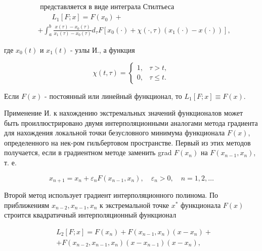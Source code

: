 \documentclass[10pt]{article}
\begin{document}
\[

\begin{aligned}

& \text { представляется в виде интеграла Стилтьеса } \\

& \qquad L_{1}[F ; x]=F\left(x_{0}\right)+ \\

& +\int_{a}^{b} \frac{x(\tau)-x_{0}(\tau)}{x_{1}(\tau)-x_{0}(\tau)} d_{\tau} F\left[x_{0}(\cdot)+\chi(\cdot, \tau)\left(x_{1}(\cdot)-x(\cdot)\right)\right],

\end{aligned}

\]



где $x_{0}(t)$ и $x_{1}(t)$ - узлы И., а функция



\[

\chi(t, \tau)= \begin{cases}1, & \tau>t, \\ 0, & \tau \leqslant t .\end{cases}

\]



Если $F(x)$ - постоянный или линейный функционал, то $L_{1}[F ; x] \equiv F(x)$.



Применение И. к нахождению экстремальных значений функционалов может быть проиллюстрировано двумя интерполяционными аналогами метода градиента для нахождения локальной точки безусловного минимума функционала $F(x)$, определенного на нек-ром гильбертовом пространстве. Первый из этих методов получается, если в градиентном методе заменить grad $F\left(x_{n}\right)$ на $F\left(x_{n-1}, x_{n}\right)$, т. е.



\[

x_{n+1}=x_{n}+\varepsilon_{n} F\left(x_{n-1}, x_{n}\right), \quad \varepsilon_{n}>0, \quad n=1,2, \ldots

\]



Второй метод использует градиент интерполяционного полинома. По приближениям $x_{n-2}, x_{n-1}, x_{n}$ к экстремальной точке $x^{*}$ функционала $F(x)$ строится квадратичный интерполяционный функционал



\[

\begin{aligned}

& L_{2}[F ; x]=F\left(x_{n}\right)+F\left(x_{n-1}, x_{n}\right)\left(x-x_{n}\right)+ \\

& +F\left(x_{n-2}, x_{n-1}, x_{n}\right)\left(x-x_{n-1}\right)\left(x-x_{n}\right),

\end{aligned}

\]
\end{document}
